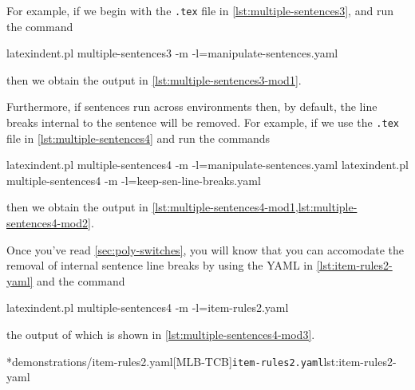 	For example, if we begin with the \texttt{.tex} file in
	\cref{lst:multiple-sentences3}, and run the command
	\begin{commandshell}
latexindent.pl multiple-sentences3 -m -l=manipulate-sentences.yaml
	\end{commandshell}
	then we obtain the output in \cref{lst:multiple-sentences3-mod1}. 

	Furthermore, if sentences run across environments then, by default, the line breaks
	internal to the sentence will be removed. For example, if we use the
	\texttt{.tex} file in \cref{lst:multiple-sentences4} and run the commands
	\begin{commandshell}
latexindent.pl multiple-sentences4 -m -l=manipulate-sentences.yaml
latexindent.pl multiple-sentences4 -m -l=keep-sen-line-breaks.yaml
	\end{commandshell}
	then we obtain the output in \cref{lst:multiple-sentences4-mod1,lst:multiple-sentences4-mod2}. 
	\begin{widepage}
	\end{widepage}
	Once you've read \cref{sec:poly-switches}, you will know that you can accomodate the
	removal of internal sentence line breaks by using the YAML in \cref{lst:item-rules2-yaml}
	and the command
	\begin{commandshell}
latexindent.pl multiple-sentences4 -m -l=item-rules2.yaml
	\end{commandshell}
	the output of which is shown in \cref{lst:multiple-sentences4-mod3}.

	\begin{cmhtcbraster}
		\cmhlistingsfromfile[style=yaml-LST]*{demonstrations/item-rules2.yaml}[MLB-TCB]{\texttt{item-rules2.yaml}}{lst:item-rules2-yaml}
	\end{cmhtcbraster}

